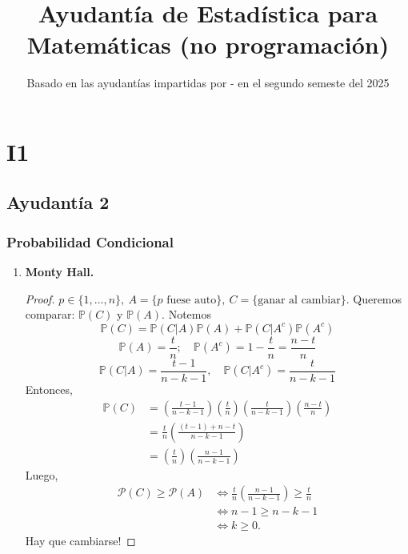 \documentclass[a4paper]{report}
\title{Ayudantía de Estadística para Matemáticas (no programación)}
\author{}
\date{Basado en las ayudantías impartidas por - en el segundo semeste del 2025}
\begin{document}
\maketitle
\tableofcontents

\chapter{I1}
\setcounter{section}{0}
\section{Ayudantía 2}
\subsection{Probabilidad Condicional}
\begin{enumerate}
	\item \textbf{Monty Hall.}

	\begin{proof}
		$p\in \{1,\dots,n\},\ A = \{ p \text{ fuese auto}\},\ C = \{ \text{ganar al cambiar} \}$. Queremos comparar: $\mathbb{P}(C)$ y $\mathbb{P}(A)$. Notemos
		\[ \mathbb{P}(C) = \mathbb{P}(C|A)\mathbb{P}(A) + \mathbb{P}(C|A^c)\mathbb{P}(A^c) \]
		\[ \mathbb{P}(A) = \frac{t}{n};\quad \mathbb{P}(A^c) = 1 - \frac{t}{n} = \frac{n-t}{n} \]
		\[ \mathbb{P}(C|A) = \frac{t-1}{n-k-1},\quad \mathbb{P}(C|A^c) = \frac{t}{n-k-1} \]
		Entonces,
		\begin{align*}
			\mathbb{P}(C) & = \left( \frac{t-1}{n-k-1} \right) \left( \frac{t}{n} \right) \left( \frac{t}{n-k-1} \right) \left( \frac{n-t}{n} \right) \\
			& = \frac{t}{n} \left( \frac{(t-1) + n - t}{n-k-1} \right) \\
			& = \left( \frac{t}{n} \right) \left(\frac{n-1}{n-k-1} \right)
		\end{align*}
		Luego,
		\begin{align*}
			\mathcal{P}(C) \geq \mathcal{P}(A) & \iff \frac{t}{n} \left( \frac{n-1}{n-k-1} \right) \geq \frac{t}{n} \\
			& \iff n-1 \geq n-k-1 \\
			& \iff k \geq 0
		.\end{align*}
		Hay que cambiarse!
	\end{proof}


\end{enumerate}
\end{document}
